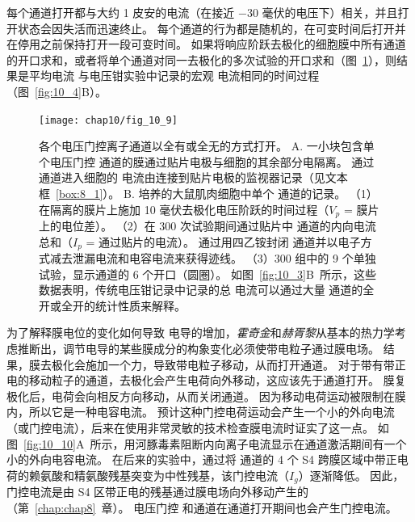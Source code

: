 每个通道打开都与大约 1 皮安的电流（在接近 −30 毫伏的电压下）相关，并且打开状态会因失活而迅速终止。 
每个通道的行为都是随机的，在可变时间后打开并在停用之前保持打开一段可变时间。
如果将响应阶跃去极化的细胞膜中所有通道的开口求和，或者将单个通道对同一去极化的多次试验的开口求和（图~\ref{fig:10_9}），则结果是平均电流 与电压钳实验中记录的宏观  电流相同的时间过程（图~\ref{fig:10_4}B）。


\begin{figure}[htbp]
	\centering
	\texttt{[image: chap10/fig\_10\_9]}
	\caption{各个电压门控离子通道以全有或全无的方式打开。
		A. 一小块包含单个电压门控  通道的膜通过贴片电极与细胞的其余部分电隔离。
		通过通道进入细胞的  电流由连接到贴片电极的监视器记录（见文本框~\ref{box:8_1}）。
		B. 培养的大鼠肌肉细胞中单个  通道的记录。
		（1）在隔离的膜片上施加 10 毫伏去极化电压阶跃的时间过程（$V_p$ = 膜片上的电位差）。
		（2）在 300 次试验期间通过贴片中  通道的内向电流总和（$I_p$ = 通过贴片的电流）。
		通过用四乙铵封闭  通道并以电子方式减去泄漏电流和电容电流来获得迹线。
		（3）300 组中的 9 个单独试验，显示通道的 6 个开口（圆圈）。
		如图~\ref{fig:10_3}B~所示，这些数据表明，传统电压钳记录中记录的总  电流可以通过大量  通道的全开或全开的统计性质来解释\cite{sigworth1980single}。}
	\label{fig:10_9}
\end{figure}


为了解释膜电位的变化如何导致  电导的增加，\textit{霍奇金}和\textit{赫胥黎}从基本的热力学考虑推断出，调节电导的某些膜成分的构象变化必须使带电粒子通过膜电场。
结果，膜去极化会施加一个力，导致带电粒子移动，从而打开通道。
对于带有带正电的移动粒子的通道，去极化会产生电荷向外移动，这应该先于通道打开。
膜复极化后，电荷会向相反方向移动，从而关闭通道。 
因为移动电荷运动被限制在膜内，所以它是一种电容电流。
预计这种门控电荷运动会产生一个小的外向电流（或门控电流），后来在使用非常灵敏的技术检查膜电流时证实了这一点。
如图~\ref{fig:10_10}A~所示，用河豚毒素阻断内向离子电流显示在通道激活期间有一个小的外向电容电流。 
在后来的实验中，通过将  通道的 4 个 S4 跨膜区域中带正电荷的赖氨酸和精氨酸残基突变为中性残基，该门控电流（$I_g$）逐渐降低。
因此，门控电流是由 S4 区带正电的残基通过膜电场向外移动产生的（第~\ref{chap:chap8}~章）。 
电压门控  和通道在通道打开期间也会产生门控电流。


